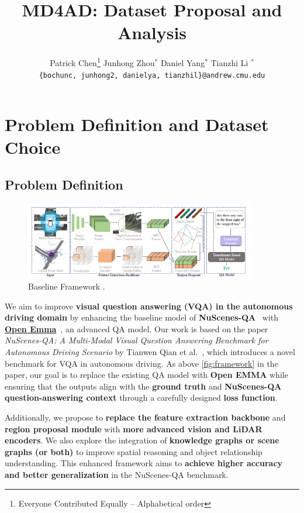 \documentclass{article} %
\title{MD4AD: Dataset Proposal and Analysis}
\author{
	Patrick Chen\thanks{\hspace{4pt}Everyone Contributed Equally -- Alphabetical order} \hspace{2em} Junhong Zhou$^*$ \hspace{2em} Daniel Yang$^*$ \hspace{2em} Tianzhi Li $^*$ \\
	\texttt{\{bochunc, junhong2, danielya, tianzhil\}@andrew.cmu.edu}
}
\date{}
\begin{document}
	\maketitle
	
	\section{ Problem Definition and Dataset Choice}
	
	\subsection*{Problem Definition}
	\begin{figure}[H]
		\centering
		\includegraphics[width=0.9\textwidth]{./Figures/Baseline_Framework.png}
		\caption{Baseline Framework \cite{qian2024nuscenes}.}
		\label{fig:framework}
	\end{figure}
	
	We aim to improve \textbf{visual question answering (VQA) in the autonomous driving domain} by enhancing the baseline model of \textbf{NuScenes-QA}~\cite{qian2024nuscenes} with \href{https://github.com/taco-group/OpenEMMA}{\textbf{Open Emma}}~\cite{openemma}, an advanced QA model. Our work is based on the paper \textit{NuScenes-QA: A Multi-Modal Visual Question Answering Benchmark for Autonomous Driving Scenario} by Tianwen Qian et al.~\cite{qian2024nuscenes}, which introduces a novel benchmark for VQA in autonomous driving. As above \autoref{fig:framework} in the paper, our goal is to replace the existing QA model with \textbf{Open EMMA} while ensuring that the outputs align with the \textbf{ground truth} and \textbf{NuScenes-QA question-answering context} through a carefully designed \textbf{loss function}.
	
	Additionally, we propose to \textbf{replace the feature extraction backbone} and \textbf{region proposal module} with \textbf{more advanced vision and LiDAR encoders}. We also explore the integration of \textbf{knowledge graphs or scene graphs (or both)} to improve spatial reasoning and object relationship understanding. This enhanced framework aims to \textbf{achieve higher accuracy and better generalization} in the NuScenes-QA benchmark.
	
\end{document}
